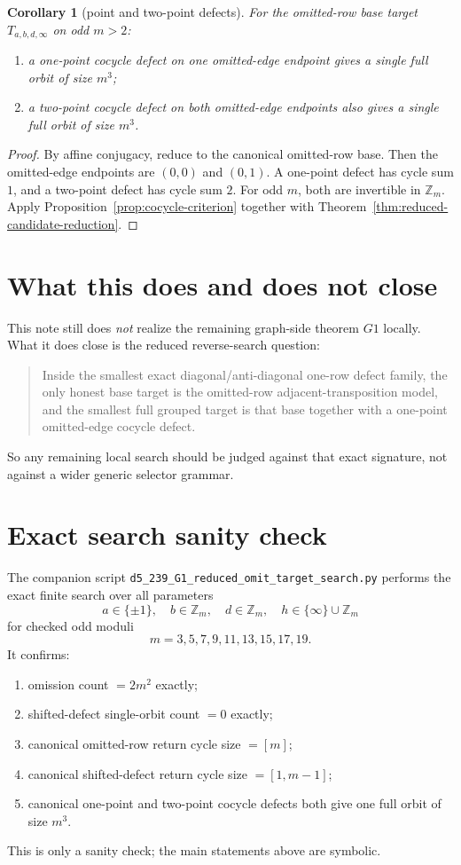 \documentclass[11pt]{article}
\newtheorem{corollary}[theorem]{Corollary}
\begin{document}
\begin{corollary}[point and two-point defects]
\label{cor:point-and-two-point}
For the omitted-row base target $T_{a,b,d,\infty}$ on odd $m>2$:
\begin{enumerate}[label=\textup{(\arabic*)},leftmargin=2.8em]
\item a one-point cocycle defect on one omitted-edge endpoint gives a single
      full orbit of size $m^3$;
\item a two-point cocycle defect on both omitted-edge endpoints also gives a
      single full orbit of size $m^3$.
\end{enumerate}
\end{corollary}

\begin{proof}
By affine conjugacy, reduce to the canonical omitted-row base.
Then the omitted-edge endpoints are $(0,0)$ and $(0,1)$.
A one-point defect has cycle sum $1$, and a two-point defect has cycle sum $2$.
For odd $m$, both are invertible in $\mathbb Z_m$.
Apply Proposition~\ref{prop:cocycle-criterion} together with
Theorem~\ref{thm:reduced-candidate-reduction}.
\end{proof}

\section{What this does and does not close}
This note still does \emph{not} realize the remaining graph-side theorem $G1$
locally.
What it does close is the reduced reverse-search question:
\begin{quote}
Inside the smallest exact diagonal/anti-diagonal one-row defect family, the
only honest base target is the omitted-row adjacent-transposition model, and the
smallest full grouped target is that base together with a one-point omitted-edge
cocycle defect.
\end{quote}
So any remaining local search should be judged against that exact signature,
not against a wider generic selector grammar.

\section{Exact search sanity check}
The companion script
\texttt{d5\_239\_G1\_reduced\_omit\_target\_search.py}
performs the exact finite search over all parameters
\[
 a\in\{\pm1\},\quad b\in\mathbb Z_m,\quad d\in\mathbb Z_m,
\quad h\in\{\infty\}\cup\mathbb Z_m
\]
for checked odd moduli
\[
 m=3,5,7,9,11,13,15,17,19.
\]
It confirms:
\begin{enumerate}[label=\textup{(\arabic*)},leftmargin=2.8em]
\item omission count $=2m^2$ exactly;
\item shifted-defect single-orbit count $=0$ exactly;
\item canonical omitted-row return cycle size $=[m]$;
\item canonical shifted-defect return cycle size $=[1,m-1]$;
\item canonical one-point and two-point cocycle defects both give one full
      orbit of size $m^3$.
\end{enumerate}
This is only a sanity check; the main statements above are symbolic.
\end{document}
